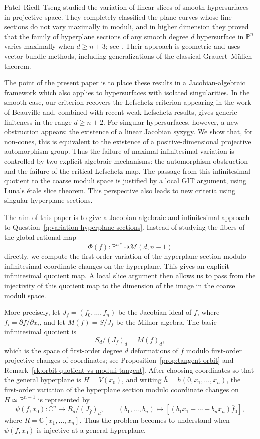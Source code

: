 \documentclass[11pt]{amsart}
\theoremstyle{plain}
\theoremstyle{definition}
\numberwithin{equation}{section}
\newcommand{\M}{{\mathcal M}}
\newcommand{\C}{\mathbb{C}}
\newcommand{\PP}{\mathbb{P}}
\begin{document}
Patel--Riedl--Tseng studied the variation of linear slices of smooth hypersurfaces in projective space. They completely classified the plane curves whose line sections do not vary maximally in moduli, and in higher dimension they proved that the family of hyperplane sections of any smooth degree $d$ hypersurface in $\PP^n$ varies maximally when $d\geq n+3$; see \cite{PRT}. Their approach is geometric and uses vector bundle methods, including generalizations of the classical Grauert--Mülich theorem.


The point of the present paper is to place these results in a
Jacobian-algebraic framework which also applies to hypersurfaces with isolated
singularities. In the smooth case, our criterion recovers the Lefschetz
criterion appearing in the work of Beauville and, combined with recent weak
Lefschetz results, gives generic finiteness in the range $d\geq n+2$. For
singular hypersurfaces, however, a new obstruction appears: the existence of a
linear Jacobian syzygy. We show that, for non-cones, this is equivalent to the
existence of a positive-dimensional projective automorphism group. Thus the
failure of maximal infinitesimal variation is controlled by two explicit
algebraic mechanisms: the automorphism obstruction and the failure of the
critical Lefschetz map. The passage from this infinitesimal quotient to the
coarse moduli space is justified by a local GIT argument, using Luna's
\'etale slice theorem. This perspective also leads to new criteria using
singular hyperplane sections.

The aim of this paper is to give a Jacobian-algebraic and infinitesimal
approach to Question~\ref{q:variation-hyperplane-sections}. Instead of studying
the fibers of the global rational map
\[
\Phi(f):\PP^{n*}\dashrightarrow \M(d,n-1)
\]
directly, we compute the first-order variation of the hyperplane section modulo
infinitesimal coordinate changes on the hyperplane. This gives an explicit
infinitesimal quotient map. A local slice argument then allows us to pass from
the injectivity of this quotient map to the dimension of the image in the
coarse moduli space.

More precisely, let $J_f=(f_0,\ldots,f_n)$ be the Jacobian ideal of $f$, where $f_i=\partial f/\partial x_i$, and let $M(f)=S/J_f$ be the Milnor algebra. The
basic infinitesimal quotient is
\[
S_d/(J_f)_d=M(f)_d,
\]
which is the space of first-order degree $d$ deformations of $f$ modulo first-order projective changes of coordinates; see
Proposition~\ref{prop:tangent-orbit} and
Remark~\ref{rk:orbit-quotient-vs-moduli-tangent}. After choosing coordinates so that the general hyperplane is $H=V(x_0)$, and writing
$\overline h=h(0,x_1,\ldots,x_n)$, the first-order variation of the hyperplane section modulo coordinate changes on $H\simeq\PP^{n-1}$ is represented by
\[
\psi(f,x_0):\C^n\to R_d/(J_{\overline f})_d,\qquad
(b_1,\ldots,b_n)\mapsto
[(b_1x_1+\cdots+b_nx_n)\overline f_0],
\]
where $R=\C[x_1,\ldots,x_n]$. Thus the problem becomes to understand when $\psi(f,x_0)$ is injective at a general hyperplane.
\end{document}
